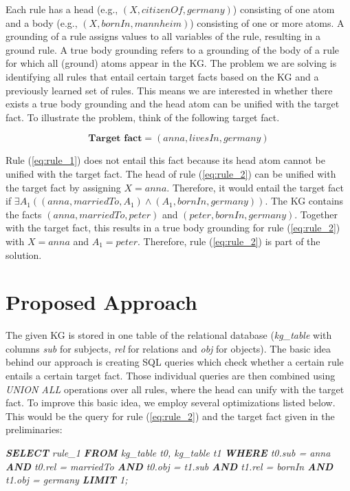 \documentclass[english]{lni}
\begin{document}
Each rule has a head (e.g., \((X, citizenOf, germany)\)) consisting of one atom and a body (e.g., \((X, 
bornIn, mannheim)\)) consisting of one or more atoms. A grounding of a rule assigns values to all variables of the rule, resulting in a ground rule. A true body grounding refers to a grounding of the body of a rule for which all (ground) atoms appear in the KG. The problem we are solving is identifying all rules that entail certain target facts based on the KG and a previously learned set of rules. This means we are interested in whether there exists a true body grounding and the head atom can be unified with the target fact. To illustrate the problem, think of the following target fact.

\begin{equation*} \label{eq:target_1}
\textbf{Target fact} = (anna, livesIn, germany)
\end{equation*}


Rule (\ref{eq:rule_1}) does not entail this fact because its head atom cannot be unified with the target fact.
The head of rule (\ref{eq:rule_2}) can be unified with the target fact by assigning \(X = anna\). Therefore, it would entail the target fact if \(\exists A_1 ((anna, marriedTo, A_1) \wedge (A_1, bornIn, germany))\). The KG contains the facts \((anna, marriedTo, peter)\) and \((peter, bornIn, germany)\). Together with the target fact, this results in a true body grounding for rule (\ref{eq:rule_2}) with \(X = anna\) and \(A_1 = peter\). Therefore, rule (\ref{eq:rule_2}) is part of the solution.

\section{Proposed Approach}

The given KG is stored in one table of the relational database (\textit{kg\_table} with columns \textit{sub} for subjects, \textit{rel} for relations and \textit{obj} for objects). The basic idea behind our approach is creating SQL queries which check whether a certain rule entails a certain target fact. Those individual queries are then combined using \textit{UNION ALL} operations over all rules, where the head can unify with the target fact. To improve this basic idea, we employ several optimizations listed below. This would be the query for rule (\ref{eq:rule_2}) and the target fact given in the preliminaries:

\textit{\textbf{SELECT} rule\_1 \textbf{FROM} kg\_table t0,  kg\_table t1 \textbf{WHERE} t0.sub = anna \textbf{AND} t0.rel = marriedTo \textbf{AND} t0.obj = t1.sub \textbf{AND} t1.rel = bornIn \textbf{AND} t1.obj = germany \textbf{LIMIT} 1;}
\end{document}

